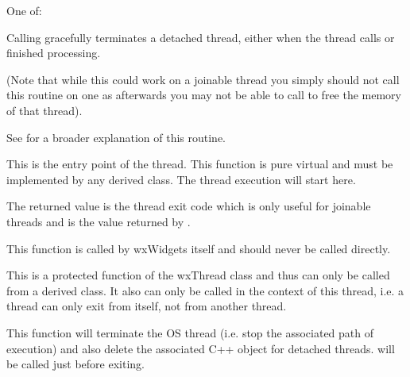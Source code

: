 
One of:

\twocolwidtha{7cm}
\begin{twocollist}\itemsep=0pt
\end{twocollist}


\label{wxthreaddelete}


Calling  gracefully terminates a 
detached thread, either when the thread calls  or finished processing.

(Note that while this could work on a joinable thread you simply should not
call this routine on one as afterwards you may not be able to call 
 to free the memory of that thread).

See  for a broader explanation of this routine.


\label{wxthreadentry}


This is the entry point of the thread. This function is pure virtual and must
be implemented by any derived class. The thread execution will start here.

The returned value is the thread exit code which is only useful for
joinable threads and is the value returned by .

This function is called by wxWidgets itself and should never be called
directly.


\label{wxthreadexit}


This is a protected function of the wxThread class and thus can only be called
from a derived class. It also can only be called in the context of this
thread, i.e. a thread can only exit from itself, not from another thread.

This function will terminate the OS thread (i.e. stop the associated path of
execution) and also delete the associated C++ object for detached threads.
 will be called just before exiting.


